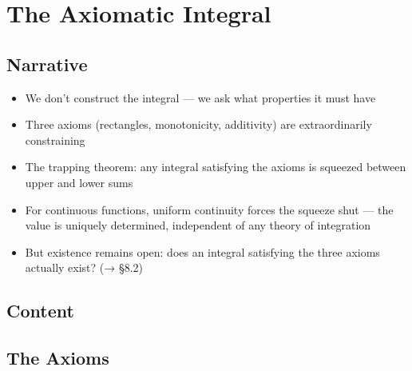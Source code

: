 \documentclass[
  10pt,
  letterpaper,
]{scrbook}
\providecommand{\tightlist}{%
  \setlength{\itemsep}{0pt}\setlength{\parskip}{0pt}}
\begin{document}
\section{The Axiomatic Integral}\label{the-axiomatic-integral}

\subsection{Narrative}\label{narrative-34}

\begin{itemize}
\tightlist
\item
  We don't construct the integral --- we ask what properties it must
  have
\item
  Three axioms (rectangles, monotonicity, additivity) are
  extraordinarily constraining
\item
  The trapping theorem: any integral satisfying the axioms is squeezed
  between upper and lower sums
\item
  For continuous functions, uniform continuity forces the squeeze shut
  --- the value is uniquely determined, independent of any theory of
  integration
\item
  But existence remains open: does an integral satisfying the three
  axioms actually exist? (→ §8.2)
\end{itemize}

\subsection{Content}\label{content-34}

\subsection{The Axioms}\label{the-axioms}
\end{document}
